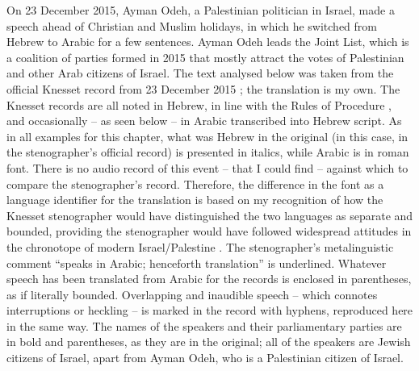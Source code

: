 \documentclass[output=paper,arabicfont]{langscibook}
\begin{document}
On 23 December 2015, Ayman Odeh, a Palestinian politician in Israel, made a speech ahead of Christian and Muslim holidays, in which he switched from Hebrew to Arabic for a few sentences. Ayman Odeh leads the Joint List, which is a coalition of parties formed in 2015 that mostly attract the votes of Palestinian and other Arab citizens of Israel. The text analysed below was taken from the official Knesset record from 23 December 2015 \citep[130–131]{knesset2015a}; the translation is my own. The Knesset records are all noted in Hebrew, in line with the Rules of Procedure \citep{knesset2012a}, and occasionally – as seen below – in Arabic transcribed into Hebrew script. As in all examples for this chapter, what was Hebrew in the original (in this case, in the stenographer’s official record) is presented in italics, while Arabic is in roman font. There is no audio record of this event – that I could find – against which to compare the stenographer’s record. Therefore, the difference in the font as a language identifier for the translation is based on my recognition of how the Knesset stenographer would have distinguished the two languages as separate and bounded, providing the stenographer would have followed widespread attitudes in the chronotope of modern Israel/Palestine \citep[xii–xiii]{shohamy2005a}. The stenographer’s metalinguistic comment “speaks in Arabic; henceforth translation” is underlined. Whatever speech has been translated from Arabic for the records is enclosed in parentheses, as if literally bounded. Overlapping and inaudible speech – which connotes interruptions or heckling – is marked in the record with hyphens, reproduced here in the same way. The names of the speakers and their parliamentary parties are in bold and parentheses, as they are in the original; all of the speakers are Jewish citizens of Israel, apart from Ayman Odeh, who is a Palestinian citizen of Israel.\\
\end{document}
